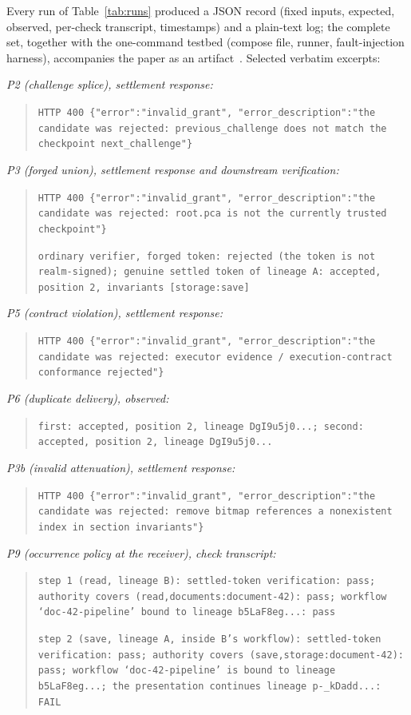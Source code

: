 \documentclass[conference]{IEEEtran}
\begin{document}
Every run of Table~\ref{tab:runs} produced a JSON record (fixed inputs, expected, observed, per-check transcript, timestamps) and a plain-text log; the complete set, together with the one-command testbed (compose file, runner, fault-injection harness), accompanies the paper as an artifact~\cite{picartifact}. Selected verbatim excerpts:

\emph{P2 (challenge splice), settlement response:}
\begin{quote}
\scriptsize
\texttt{HTTP 400 \{"error":"invalid\_grant", "error\_description":"the candidate was rejected: previous\_challenge does not match the checkpoint next\_challenge"\}}
\end{quote}

\emph{P3 (forged union), settlement response and downstream verification:}
\begin{quote}
\scriptsize
\texttt{HTTP 400 \{"error":"invalid\_grant", "error\_description":"the candidate was rejected: root.pca is not the currently trusted checkpoint"\}}

\texttt{ordinary verifier, forged token: rejected (the token is not realm-signed); genuine settled token of lineage A: accepted, position 2, invariants [storage:save]}
\end{quote}

\emph{P5 (contract violation), settlement response:}
\begin{quote}
\scriptsize
\texttt{HTTP 400 \{"error":"invalid\_grant", "error\_description":"the candidate was rejected: executor evidence / execution-contract conformance rejected"\}}
\end{quote}

\emph{P6 (duplicate delivery), observed:}
\begin{quote}
\scriptsize
\texttt{first: accepted, position 2, lineage DgI9u5j0...; second: accepted, position 2, lineage DgI9u5j0...}
\end{quote}

\emph{P3b (invalid attenuation), settlement response:}
\begin{quote}
\scriptsize
\texttt{HTTP 400 \{"error":"invalid\_grant", "error\_description":"the candidate was rejected: remove bitmap references a nonexistent index in section invariants"\}}
\end{quote}

\emph{P9 (occurrence policy at the receiver), check transcript:}
\begin{quote}
\scriptsize
\texttt{step 1 (read, lineage B): settled-token verification: pass; authority covers (read,documents:document-42): pass; workflow `doc-42-pipeline' bound to lineage b5LaF8eg...: pass}

\texttt{step 2 (save, lineage A, inside B's workflow): settled-token verification: pass; authority covers (save,storage:document-42): pass; workflow `doc-42-pipeline' is bound to lineage b5LaF8eg...; the presentation continues lineage p-\_kDadd...: FAIL}
\end{quote}
\end{document}
